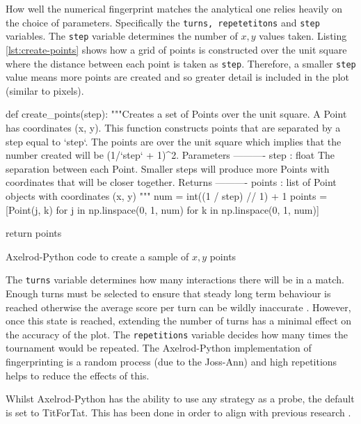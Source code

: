 How well the numerical fingerprint matches the analytical one relies heavily on the choice of parameters.
Specifically the \texttt{turns, repetetitons} and \texttt{step} variables.
The \texttt{step} variable determines the number of $x,y$ values taken.
Listing \ref{lst:create-points} shows how a grid of points is constructed over the unit square where the distance between each point is taken as \texttt{step}.
Therefore, a smaller \texttt{step} value means more points are created and so greater detail is included in the plot (similar to pixels).

\begin{listing}[hbtp!]
\begin{SourceCode}
def create_points(step):
    """Creates a set of Points over the unit square.
    A Point has coordinates (x, y). This function constructs points that are
    separated by a step equal to `step`. The points are over the unit
    square which implies that the number created will be (1/`step` + 1)^2.
    Parameters
    ----------
    step : float
        The separation between each Point. Smaller steps will produce more
        Points with coordinates that will be closer together.
    Returns
    ----------
    points : list
        of Point objects with coordinates (x, y)
    """
    num = int((1 / step) // 1) + 1
    points = [Point(j, k) for j in np.linspace(0, 1, num)
              for k in np.linspace(0, 1, num)]

    return points
\end{SourceCode}
\caption{Axelrod-Python code to create a sample of $x,y$ points}
\label{lst:create-points}
\end{listing}

The \texttt{turns} variable determines how many interactions there will be in a match.
Enough turns must be selected to ensure that steady long term behaviour is reached otherwise the average score per turn can be wildly inaccurate \cite{Robinson2004}.
However, once this state is reached, extending the number of turns has a minimal effect on the accuracy of the plot.
The \texttt{repetitions} variable decides how many times the tournament would be repeated.
The Axelrod-Python implementation of fingerprinting is a random process (due to the Joss-Ann) and high repetitions helps to reduce the effects of this.

Whilst Axelrod-Python has the ability to use any strategy as a probe, the default is set to TitForTat.
This has been done in order to align with previous research \cite{ Ashlock2004,  Ashlock2005, Ashlock2006}.



